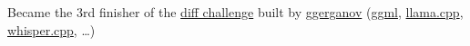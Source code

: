 {Became the 3rd finisher of the \href{https://github.com/ggerganov/diff-challenge}{diff challenge} built by \href{https://github.com/ggerganov}{ggerganov} (\href{https://github.com/ggerganov/ggml}{ggml}, \href{https://github.com/ggerganov/llama.cpp}{llama.cpp}, \href{https://github.com/ggerganov/whisper.cpp}{whisper.cpp}, \ldots)}
